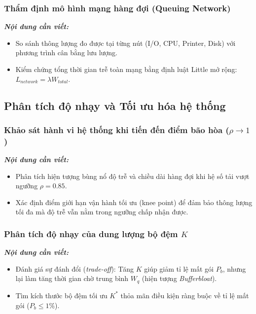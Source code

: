 \subsubsection{Thẩm định mô hình mạng hàng đợi (Queuing Network)}
\textit{\textbf{Nội dung cần viết:}}
\begin{itemize}[leftmargin=1.5em]
    \item So sánh thông lượng đo được tại từng nút (I/O, CPU, Printer, Disk) với phương trình cân bằng lưu lượng.
    \item Kiểm chứng tổng thời gian trễ toàn mạng bằng định luật Little mở rộng: $L_{network} = \lambda W_{total}$.
\end{itemize}

\subsection{Phân tích độ nhạy và Tối ưu hóa hệ thống}
\label{subsec:sensitivity-tuning}

\subsubsection{Khảo sát hành vi hệ thống khi tiến đến điểm bão hòa (\texorpdfstring{$\rho \to 1$}{rho -> 1})}
\textit{\textbf{Nội dung cần viết:}}
\begin{itemize}[leftmargin=1.5em]
    \item Phân tích hiện tượng bùng nổ độ trễ và chiều dài hàng đợi khi hệ số tải vượt ngưỡng $\rho = 0.85$.
    \item Xác định điểm giới hạn vận hành tối ưu (knee point) để đảm bảo thông lượng tối đa mà độ trễ vẫn nằm trong ngưỡng chấp nhận được.
\end{itemize}

\subsubsection{Phân tích độ nhạy của dung lượng bộ đệm \texorpdfstring{$K$}{K}}
\textit{\textbf{Nội dung cần viết:}}
\begin{itemize}[leftmargin=1.5em]
    \item Đánh giá sự đánh đổi (\textit{trade-off}): Tăng $K$ giúp giảm tỉ lệ mất gói $P_b$, nhưng lại làm tăng thời gian chờ trung bình $W_q$ (hiện tượng \textit{Bufferbloat}).
    \item Tìm kích thước bộ đệm tối ưu $K^*$ thỏa mãn điều kiện ràng buộc về tỉ lệ mất gói ($P_b \le 1\%$).
\end{itemize}

